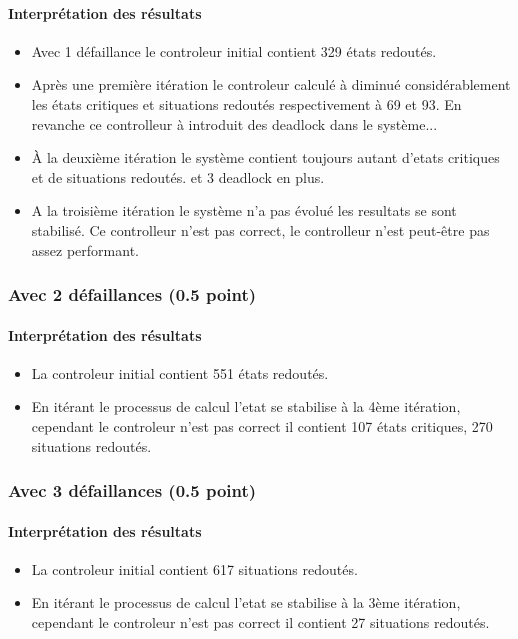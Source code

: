\documentclass[a4paper]{book}
\begin{document}
\paragraph{Interprétation des résultats}
\begin{itemize}
    \item Avec 1 défaillance le controleur initial contient 329 états redoutés.
    \item Après une première itération le controleur calculé à diminué considérablement les états critiques 
        et situations redoutés respectivement à 69 et 93.
        En revanche ce controlleur à introduit des deadlock dans le système...
    \item À la deuxième itération le système contient toujours autant d'etats critiques et de situations redoutés.
        et 3 deadlock en plus.
    \item A la troisième itération le système n'a pas évolué les resultats se sont stabilisé.
          Ce controlleur n'est pas correct, le controlleur n'est peut-être pas assez performant. 
\end{itemize}

\subsubsection{Avec 2 défaillances (0.5 point)}

\paragraph{Interprétation des résultats}
\begin{itemize}
    \item La controleur initial contient 551 états redoutés.
    \item En itérant le processus de calcul l'etat se stabilise à la 4ème itération, cependant
        le controleur n'est pas correct il contient 107 états critiques, 270 situations redoutés.
\end{itemize}

\subsubsection{Avec 3 défaillances (0.5 point)}

\paragraph{Interprétation des résultats}
\begin{itemize}
    \item La controleur initial contient 617 situations redoutés.
    \item En itérant le processus de calcul l'etat se stabilise à la 3ème itération, cependant
        le controleur n'est pas correct il contient 27 situations redoutés.
\end{itemize}
\end{document}
